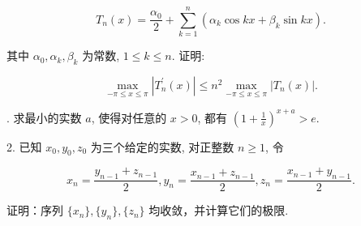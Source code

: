 \documentclass{examcollection}
\renewcommand{\displayformula}[1]{\[#1\]}
\begin{document}
{\begin{minipage}{\textwidth}
\displayformula{T _ {n} (x) = \frac {\alpha_ {0}}{2} + \sum_ {k = 1} ^ {n} (\alpha_ {k} \cos k x + \beta_ {k} \sin k x).}\par
其中 $\alpha_0, \alpha_k, \beta_k$ 为常数, $1 \leq k \leq n$. 证明:\par
\displayformula{\max _ {- \pi \leq x \leq \pi} \left| T _ {n} ^ {\prime} (x) \right| \leq n ^ {2} \max _ {- \pi \leq x \leq \pi} \left| T _ {n} (x) \right|.}\par
{}. 求最小的实数 $a$, 使得对任意的 $x > 0$, 都有 $\left(1 + \frac{1}{x}\right)^{x + a} > e$.\par
2. 已知 $x_0, y_0, z_0$ 为三个给定的实数, 对正整数 $n \geq 1$, 令\par
\displayformula{x _ {n} = \frac {y _ {n - 1} + z _ {n - 1}}{2}, y _ {n} = \frac {x _ {n - 1} + z _ {n - 1}}{2}, z _ {n} = \frac {x _ {n - 1} + y _ {n - 1}}{2}.}\par
证明：序列 $\{x_{n}\} ,\{y_{n}\} ,\{z_{n}\}$ 均收敛，并计算它们的极限.\par
\end{minipage}}
\ifdim\dimexpr\ht\proofbox+\dp\proofbox\relax>\textheight
\noindent\resizebox{!}{\textheight}{\usebox{\proofbox}}\else\noindent\usebox{\proofbox}\fi\clearpage
\end{document}
